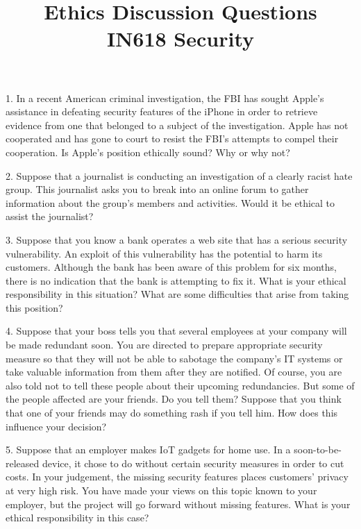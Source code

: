 \documentclass{article}
\begin{document}
\title{ Ethics Discussion Questions \\ IN618 Security}



1. In a recent American criminal investigation, the FBI has sought Apple's assistance in defeating security features of the iPhone in order to retrieve evidence from one that belonged to a subject of the investigation. Apple has not cooperated and has gone to court to resist the FBI's attempts to compel their cooperation. Is Apple's position ethically sound? Why or why not?

\vspace{10mm}

2. Suppose that a journalist is conducting an investigation of a clearly racist hate group. This journalist asks you to break into an online forum to gather information about the group's members and activities. Would it be ethical to assist the journalist?

\vspace{10mm}

3. Suppose that you know a bank operates a web site that has a serious security vulnerability. An exploit of this vulnerability has the potential to harm its customers. Although the bank has been aware of this problem for six months, there is no indication that the bank is attempting to fix it. What is your ethical responsibility in this situation? What are some difficulties that arise from taking this position?

\vspace{10mm}

4. Suppose that your boss tells you that several employees at your company will be made redundant soon. You are directed to prepare appropriate security measure so that they will not be able to sabotage the company's IT systems or take valuable information from them after they are notified. Of course, you are also told not to tell these people about their upcoming redundancies. But some of the people affected are your friends. Do you tell them? Suppose that you think that one of your friends may do something rash if you tell him. How does this influence your decision?

\vspace{10mm}

5. Suppose that an employer makes IoT gadgets for home use. In a soon-to-be-released device, it chose to do without certain security measures in order to cut costs. In your judgement, the missing security features places customers' privacy at very high risk. You have made your views on this topic known to your employer, but the project will go forward without missing features. What is your ethical responsibility in this case?
\end{document}
